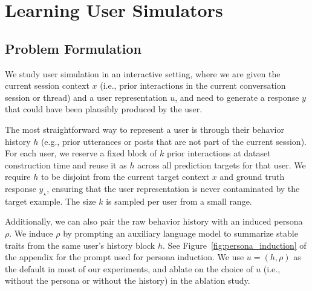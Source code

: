 \documentclass[11pt]{article}
\begin{document}


\section{Learning User Simulators}

\subsection{Problem Formulation}\label{sec:problem}


We study user simulation in an interactive setting, where we are given the current session context $x$ (i.e., prior interactions in the current conversation session or thread) and a user representation $u$, and need to generate a response $y$ that could have been plausibly produced by the user. 

The most straightforward way to represent a user is through their behavior history $h$ (e.g., prior utterances or posts that are not part of the current session). For each user, we reserve a fixed block of $k$ prior interactions at dataset construction time and reuse it as $h$ across all prediction targets for that user. We require $h$ to be disjoint from the current target context $x$ and ground truth response $y_\star$, ensuring that the user representation is never contaminated by the target example. The size $k$ is sampled per user from a small range.

Additionally, we can also pair the raw behavior history with an induced persona $\rho$. We induce $\rho$ by prompting an auxiliary language model to summarize stable traits from the same user's history block $h$. See  Figure~\ref{fig:persona_induction} of the appendix for the prompt used for persona induction. We use $u = (h, \rho)$ as the default in most of our experiments, and ablate on the choice of $u$ (i.e., without the persona or without the history) in the ablation study.
\end{document}
